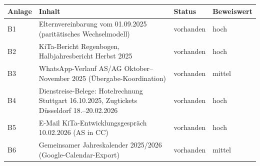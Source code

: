 \documentclass[
  11pt,
  a4paper,
]{article}
\newcounter{none}
\begin{document}
{\def\LTcaptype{none} %
\begin{longtable}[]{@{}
  >{\raggedright\arraybackslash}p{}
  >{\raggedright\arraybackslash}p{}
  >{\raggedright\arraybackslash}p{}
  >{\raggedright\arraybackslash}p{}@{}}
\toprule\noalign{}
\begin{minipage}[b]{\linewidth}\raggedright
Anlage
\end{minipage} & \begin{minipage}[b]{\linewidth}\raggedright
Inhalt
\end{minipage} & \begin{minipage}[b]{\linewidth}\raggedright
Status
\end{minipage} & \begin{minipage}[b]{\linewidth}\raggedright
Beweiswert
\end{minipage} \\
\midrule\noalign{}
\endhead
\bottomrule\noalign{}
\endlastfoot
B1 & Elternvereinbarung vom 01.09.2025 (paritätisches Wechselmodell) &
vorhanden & hoch \\
B2 & KiTa-Bericht Regenbogen, Halbjahresbericht Herbst 2025 & vorhanden
& hoch \\
B3 & WhatsApp-Verlauf AS/AG Oktober--November 2025
(Übergabe-Koordination) & vorhanden & mittel \\
B4 & Dienstreise-Belege: Hotelrechnung Stuttgart 16.10.2025, Zugtickets
Düsseldorf 18.--20.02.2026 & vorhanden & hoch \\
B5 & E-Mail KiTa-Entwicklungsgespräch 10.02.2026 (AS in CC) & vorhanden
& hoch \\
B6 & Gemeinsamer Jahreskalender 2025/2026 (Google-Calendar-Export) &
vorhanden & mittel \\
\end{longtable}
}
\end{document}
